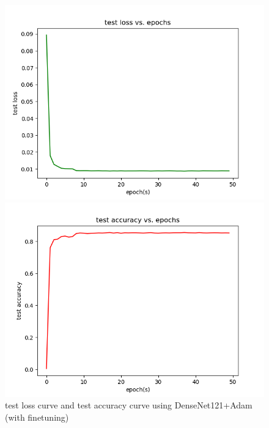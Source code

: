 \documentclass[cn]{elegantbook}
\begin{document}
\begin{figure}[!h]
	\centering
	\begin{minipage}[t]{0.48\textwidth}
		\centering
		\includegraphics[width=\textwidth]{../results/testloss_den_adam1}
	\end{minipage}
	\begin{minipage}[t]{0.48\textwidth}
		\centering
		\includegraphics[width=\textwidth]{../results/testacc_den_adam1}
	\end{minipage}
	\caption{\label{testres_den_adam1}test loss curve and test accuracy curve using DenseNet121+Adam (with finetuning)}
\end{figure}
\end{document}

